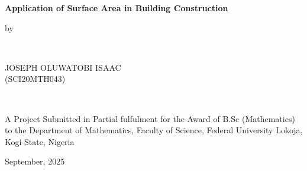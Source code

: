 \documentclass[12pt,a4paper,openany,titlepage,reqno, final]{report}
\theoremstyle{definition}
\begin{document}
	
	\begin{titlepage}
		\centering
		
		
		\vspace{3.0cm}
		{\bf \LARGE Application of Surface Area in Building Construction}
		
		\vspace{3.0cm}
		\Large{
			{by}\par \
			
			\vspace{2.5cm}
			{\Large{{JOSEPH OLUWATOBI ISAAC\\(SCI20MTH043)}}}\par \
			
			\vspace{2.5cm}
			{A Project Submitted in Partial fulfulment for the Award of B.Sc (Mathematics) to the Department of Mathematics, Faculty of Science, Federal University Lokoja, Kogi State, Nigeria} \par
			
			
			
			
			\begin{flushright}
				{September, 2025}
		\end{flushright}}
		
		
	\end{titlepage}
\end{document}
